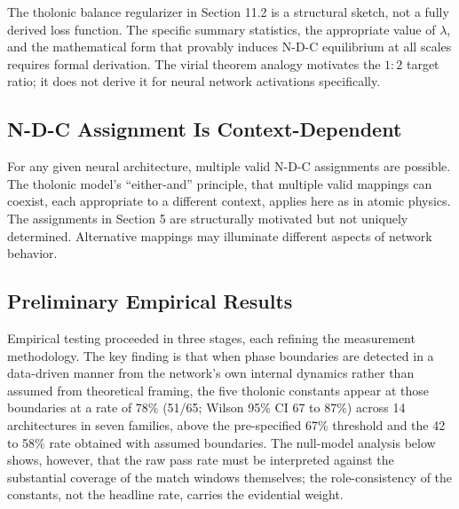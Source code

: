 \documentclass[12pt]{article}
\begin{document}
The tholonic balance regularizer in Section 11.2 is a structural sketch,
not a fully derived loss function. The specific summary statistics, the
appropriate value of \(\lambda\), and the mathematical form that
provably induces N-D-C equilibrium at all scales requires formal
derivation. The virial theorem analogy motivates the \(1:2\) target
ratio; it does not derive it for neural network activations
specifically.

\subsection{N-D-C Assignment Is Context-Dependent}\label{n-d-c-assignment-is-context-dependent}

For any given neural architecture, multiple valid N-D-C assignments are
possible. The tholonic model's ``either-and'' principle, that multiple
valid mappings can coexist, each appropriate to a different context,
applies here as in atomic physics. The assignments in Section 5 are
structurally motivated but not uniquely determined. Alternative mappings
may illuminate different aspects of network behavior.

\subsection{Preliminary Empirical Results}\label{preliminary-empirical-results}

Empirical testing proceeded in three stages, each refining the
measurement methodology. The key finding is that when phase boundaries
are detected in a data-driven manner from the network's own internal
dynamics rather than assumed from theoretical framing, the five tholonic
constants appear at those boundaries at a rate of 78\% (51/65; Wilson
95\% CI 67 to 87\%) across 14 architectures in seven families, above the
pre-specified 67\% threshold and the 42 to 58\% rate obtained with
assumed boundaries. The null-model analysis below shows, however, that
the raw pass rate must be interpreted against the substantial coverage
of the match windows themselves; the role-consistency of the constants,
not the headline rate, carries the evidential weight.
\end{document}
